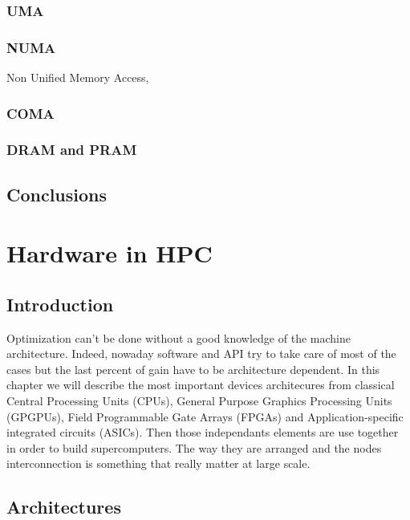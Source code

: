 \subsection{UMA}
\subsection{NUMA}

Non Unified Memory Access, 

\subsection{COMA}

\subsection{DRAM and PRAM}

\section{Conclusions}

\chapter{Hardware in HPC}

\section{Introduction}

Optimization can't be done without a good knowledge of the machine architecture. 
Indeed, nowaday software and API try to take care of most of the cases but the last percent of gain have to be architecture dependent. 
In this chapter we will describe the most important devices architecures from classical Central Processing Units (CPUs), General Purpose Graphics Processing Units (GPGPUs), Field Programmable Gate Arrays (FPGAs) and Application-specific integrated circuits (ASICs).
Then those independants elements are use together in order to build supercomputers. 
The way they are arranged and the nodes interconnection is something that really matter at large scale.  

\section{Architectures}

